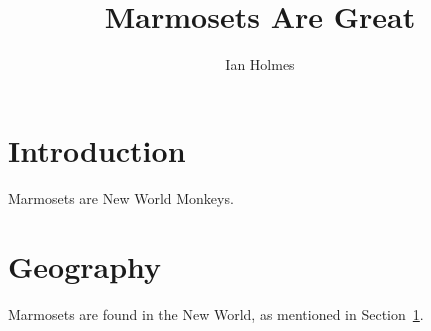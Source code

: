 \documentclass{article}
\title{Marmosets Are Great}
\author{Ian Holmes}
\begin{document}
\maketitle
{}

\section{Introduction}
\label{intro}
Marmosets are New World Monkeys.

\section{Geography}
Marmosets are found in the New World,
as mentioned in Section~\ref{intro}.
\end{document}
